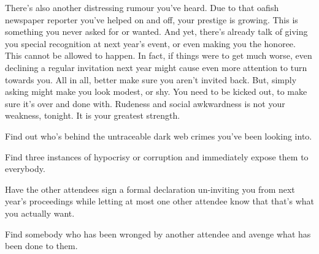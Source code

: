 \documentclass[char]{guildcamp4}
\begin{document}
There's also another distressing rumour you've heard. Due to that oafish newspaper reporter you've helped on and off, your prestige is growing. This is something you never asked for or wanted. And yet, there's already talk of giving you special recognition at next year's event, or even making you the honoree. This cannot be allowed to happen. In fact, if things were to get much worse, even declining a regular invitation next year might cause even more attention to turn towards you. All in all, better make sure you aren't invited back. But, simply asking might make you look modest, or shy. You need to be kicked out, to make sure it's over and done with. Rudeness and social awkwardness is not your weakness, tonight. It is your greatest strength.

\begin{itemz}[Goals]
	\item Find out who's behind the untraceable dark web crimes you've been looking into.
	\item Find three instances of hypocrisy or corruption and immediately expose them to everybody.
	\item Have the other attendees sign a formal declaration un-inviting you from next year's proceedings while letting at most one other attendee know that that's what you actually want.
	\item Find somebody who has been wronged by another attendee and avenge what has been done to them.
\end{itemz} 
\end{document}
